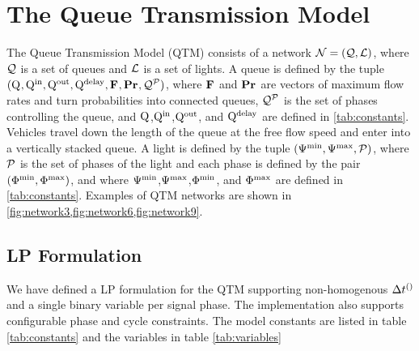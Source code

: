 \section{The Queue Transmission Model}
The Queue Transmission Model (QTM) consists of a network $\Net = (\Qset,\Lset)$, where $\Qset$ is a set of queues and $\Lset$ is a set of lights. A queue is defined by the tuple $(\QMAX{},\QIN{},\QOUT{},\QDELAY{},\Fvec{},\Prvec{},\QPset{})$, where $\Fvec{}$ and $\Prvec{}$ are vectors of maximum flow rates and turn probabilities into connected queues, $\QPset{}$ is the set of phases controlling the queue, and $\QMAX{}$,$\QIN{}$,$\QOUT{}$, and $\QDELAY{}$ are defined in \ref{tab:constants}. Vehicles travel down the length of the queue at the free flow speed and enter into a vertically stacked queue. A light is defined by the tuple $(\CTMIN{}{},\CTMAX{}{},\Pset)$, where $\Pset$ is the set of phases of the light and each phase is defined by the pair $(\PTMIN[]{}{},\PTMAX[]{}{})$, and where $\CTMIN{}{}$,$\CTMAX{}{}$,$\PTMIN[]{}{}$, and $\PTMAX[]{}{}$ are defined in \cref{tab:constants}. Examples of QTM networks are shown in \cref{fig:network3,fig:network6,fig:network9}.



\subsection{LP Formulation}
We have defined a LP formulation for the QTM supporting non-homogenous $\DT[]$ and a single binary variable per signal phase. The implementation also supports configurable phase and cycle constraints. The model constants are listed in table \ref{tab:constants} and the variables in table \ref{tab:variables}

